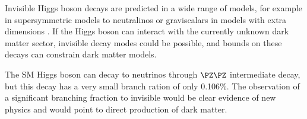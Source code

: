Invisible Higgs boson decays are predicted in a wide range of models, for example in supersymmetric models to neutralinos \cite{ARTICLE:MSSMInvisibleHiggs} or graviscalars in models with extra dimensions \cite{ARTICLE:Graviscalars,ARTICLE:ADDInvisible}. If the Higgs boson can interact with the currently unknown dark matter sector, invisible decay modes could be possible, and bounds on these decays can constrain dark matter models.

The \gls{SM} Higgs boson can decay to neutrinos through $\PZ\PZ$ intermediate decay, but this decay has a very small branch ration of only 0.106\%. The observation of a significant branching fraction to invisible would be clear evidence of new physics and would point to direct production of dark matter.


